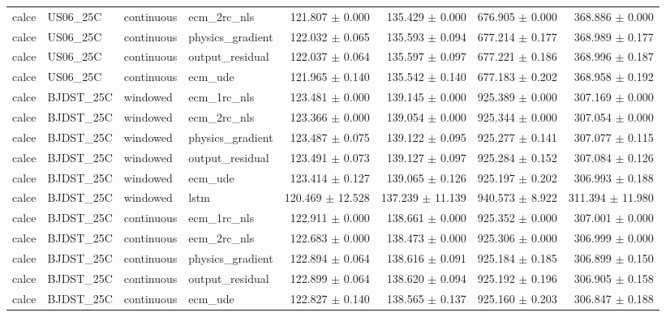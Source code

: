 \begin{longtable}{llllrrrr}
calce & US06\_25C & continuous & ecm\_2rc\_nls & 121.807 $\pm$ 0.000 & 135.429 $\pm$ 0.000 & 676.905 $\pm$ 0.000 & 368.886 $\pm$ 0.000 \\
calce & US06\_25C & continuous & physics\_gradient & 122.032 $\pm$ 0.065 & 135.593 $\pm$ 0.094 & 677.214 $\pm$ 0.177 & 368.989 $\pm$ 0.177 \\
calce & US06\_25C & continuous & output\_residual & 122.037 $\pm$ 0.064 & 135.597 $\pm$ 0.097 & 677.221 $\pm$ 0.186 & 368.996 $\pm$ 0.187 \\
calce & US06\_25C & continuous & ecm\_ude & 121.965 $\pm$ 0.140 & 135.542 $\pm$ 0.140 & 677.183 $\pm$ 0.202 & 368.958 $\pm$ 0.192 \\
calce & BJDST\_25C & windowed & ecm\_1rc\_nls & 123.481 $\pm$ 0.000 & 139.145 $\pm$ 0.000 & 925.389 $\pm$ 0.000 & 307.169 $\pm$ 0.000 \\
calce & BJDST\_25C & windowed & ecm\_2rc\_nls & 123.366 $\pm$ 0.000 & 139.054 $\pm$ 0.000 & 925.344 $\pm$ 0.000 & 307.054 $\pm$ 0.000 \\
calce & BJDST\_25C & windowed & physics\_gradient & 123.487 $\pm$ 0.075 & 139.122 $\pm$ 0.095 & 925.277 $\pm$ 0.141 & 307.077 $\pm$ 0.115 \\
calce & BJDST\_25C & windowed & output\_residual & 123.491 $\pm$ 0.073 & 139.127 $\pm$ 0.097 & 925.284 $\pm$ 0.152 & 307.084 $\pm$ 0.126 \\
calce & BJDST\_25C & windowed & ecm\_ude & 123.414 $\pm$ 0.127 & 139.065 $\pm$ 0.126 & 925.197 $\pm$ 0.202 & 306.993 $\pm$ 0.188 \\
calce & BJDST\_25C & windowed & lstm & 120.469 $\pm$ 12.528 & 137.239 $\pm$ 11.139 & 940.573 $\pm$ 8.922 & 311.394 $\pm$ 11.980 \\
calce & BJDST\_25C & continuous & ecm\_1rc\_nls & 122.911 $\pm$ 0.000 & 138.661 $\pm$ 0.000 & 925.352 $\pm$ 0.000 & 307.001 $\pm$ 0.000 \\
calce & BJDST\_25C & continuous & ecm\_2rc\_nls & 122.683 $\pm$ 0.000 & 138.473 $\pm$ 0.000 & 925.306 $\pm$ 0.000 & 306.999 $\pm$ 0.000 \\
calce & BJDST\_25C & continuous & physics\_gradient & 122.894 $\pm$ 0.064 & 138.616 $\pm$ 0.091 & 925.184 $\pm$ 0.185 & 306.899 $\pm$ 0.150 \\
calce & BJDST\_25C & continuous & output\_residual & 122.899 $\pm$ 0.064 & 138.620 $\pm$ 0.094 & 925.192 $\pm$ 0.196 & 306.905 $\pm$ 0.158 \\
calce & BJDST\_25C & continuous & ecm\_ude & 122.827 $\pm$ 0.140 & 138.565 $\pm$ 0.137 & 925.160 $\pm$ 0.203 & 306.847 $\pm$ 0.188 \\

\end{longtable}
